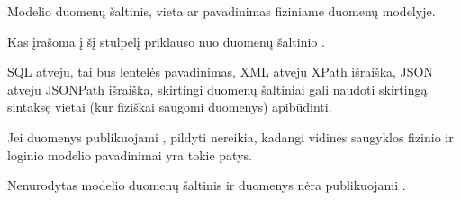 \documentclass[letterpaper,10pt,lithuanian]{sphinxmanual}
\begin{document}

\begin{fulllineitems}
\label{\detokenize{dimensijos:model.source}}
\pysigstartsignatures
\pysigline
{}
\pysigstopsignatures
\sphinxAtStartPar
Modelio duomenų šaltinis, vieta ar pavadinimas fiziniame duomenų modelyje.

\sphinxAtStartPar
Kas įrašoma į šį stulpelį priklauso nuo duomenų šaltinio {\hyperref[\detokenize{dimensijos:resource.type}]{}}.

\sphinxAtStartPar
SQL atveju, tai bus lentelės pavadinimas, XML atveju \sphinxhyphen{} XPath išraiška, JSON
atveju \sphinxhyphen{} JSONPath išraiška, skirtingi duomenų šaltiniai gali naudoti
skirtingą sintaksę vietai (kur fiziškai saugomi duomenys) apibūdinti.

\sphinxAtStartPar
Jei duomenys publikuojami ,
{\hyperref[\detokenize{dimensijos:model.source}]{}} pildyti nereikia, kadangi vidinės saugyklos fizinio ir
loginio modelio pavadinimai yra tokie patys.

\begin{sphinxtopic}
\begin{description}
\sphinxAtStartPar
Nenurodytas modelio duomenų šaltinis {\hyperref[\detokenize{dimensijos:model.source}]{}} ir duomenys nėra
publikuojami .

\end{description}
\end{sphinxtopic}

\end{fulllineitems}

\end{document}

